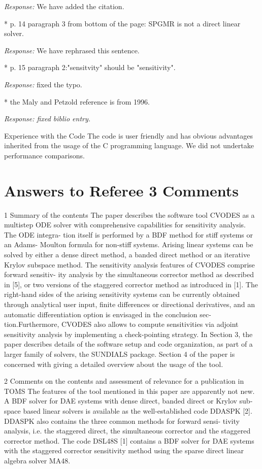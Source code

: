 {\em Response:}
We have added the citation.

* p. 14 paragraph 3 from bottom of the page: SPGMR is not a direct linear solver.

{\em Response:}
We have rephrased this sentence.

* p. 15 paragraph 2:"sensitvity" should be "sensitivity".

{\em Response:}
fixed the typo.

* the Maly and Petzold reference is from 1996.

{\em Response: fixed biblio entry.}

Experience with the Code
The code is user friendly and has obvious advantages inherited from the usage of the C programming
language. We did not undertake performance comparisons.

\newpage
\section{Answers to Referee 3 Comments}

1 Summary of the contents
The paper describes the software tool CVODES as a multistep ODE solver
with comprehensive capabilities for sensitivity analysis. The ODE integra-
tion itself is performed by a BDF method for stiff systems or an Adams-
Moulton formula for non-stiff systems. Arising linear systems can be solved
by either a dense direct method, a banded direct method or an iterative
Krylov subspace method.
The sensitivity analysis features of CVODES comprise forward sensitiv-
ity analysis by the simultaneous corrector method as described in [5], or
two versions of the staggered corrector method as introduced in [1]. The
right-hand sides of the arising sensitivity systems can be currently obtained
through analytical user input, finite differences or directional derivatives,
and an automatic differentiation option is envisaged in the conclusion sec-
tion.Furthermore, CVODES also allows to compute sensitivities via adjoint
sensitivity analysis by implementing a check-pointing strategy.
In Section 3, the paper describes details of the software setup and code
organization, as part of a larger family of solvers, the SUNDIALS package.
Section 4 of the paper is concerned with giving a detailed overview about
the usage of the tool.

2 Comments on the contents and assessment of relevance for a publication in TOMS
The features of the tool mentioned in this paper are apparently not new. A
BDF solver for DAE systems with dense direct, banded direct or Krylov sub-
space based linear solvers is available as the well-established code DDASPK
[2]. DDASPK also contains the three common methods for forward sensi-
tivity analysis, i.e. the staggered direct, the simultaneous corrector and the
staggered corrector method. The code DSL48S [1] contains a BDF solver
for DAE systems with the staggered corrector sensitivity method using the
sparse direct linear algebra solver MA48. 


